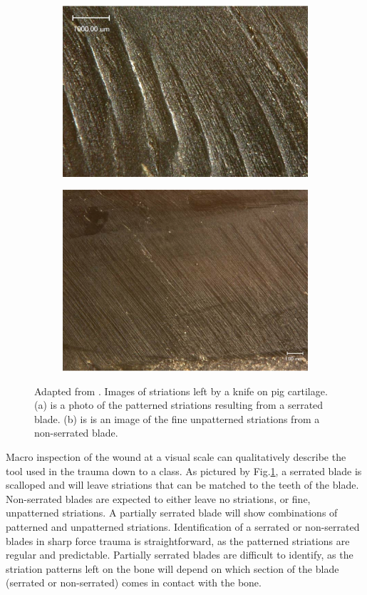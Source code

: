 \documentclass[titlepage]{article}
\begin{document}
\begin{figure}[h!]
\centering
\begin{subfigure}{.5\textwidth}
  \centering
  \includegraphics[width=.7\linewidth]{serrated}
  \caption{}
  \end{subfigure}%
\begin{subfigure}{.5\textwidth}
  \centering
  \includegraphics[width=.7\linewidth]{non_serrated}
  \caption{}
\end{subfigure}
\caption{Adapted from \cite{sharp}. Images of striations left by a knife on pig cartilage. (a) is a photo of the patterned striations resulting from a serrated blade. (b) is is an image of the fine unpatterned striations from  a non-serrated blade.}
\label{fig:blade_comp}
\end{figure}

Macro inspection of the wound at a visual scale can qualitatively describe the tool used in the trauma down to a class. As pictured by Fig.\ref{fig:blade_comp}, a serrated blade is scalloped and will leave striations that can be matched to the teeth of the blade. Non-serrated blades are expected to either leave no striations, or fine, unpatterned striations. A partially serrated blade will show combinations of patterned and unpatterned striations. Identification of a serrated or non-serrated blades in sharp force trauma is straightforward, as the patterned striations are regular and predictable. Partially serrated blades are difficult to identify, as the striation patterns left on the bone will depend on which section of the blade (serrated or non-serrated) comes in contact with the bone.
\end{document}
